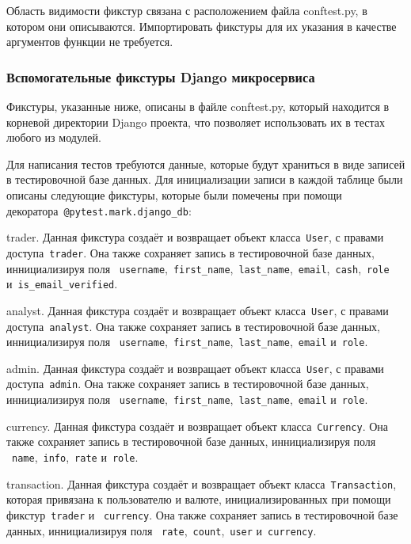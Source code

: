 Область видимости фикстур связана с расположением файла conftest.py, в котором они описываются.
Импортировать фикстуры для их указания в качестве аргументов функции не требуется.

\subsubsection{Вспомогательные фикстуры Django микросервиса}

Фикстуры, указанные ниже, описаны в файле conftest.py, который находится в корневой директории Django проекта,
что позволяет использовать их в тестах любого из модулей.

Для написания тестов требуются данные, которые будут храниться в виде записей в тестировочной базе данных.
Для инициализации записи в каждой таблице были описаны следующие фикстуры, которые были помечены при помощи декоратора~\lstinline{@pytest.mark.django_db}:
\begin{enumerate_num}
    \item trader.
    Данная фикстура создаёт и возвращает объект класса~\lstinline{User}, с правами доступа~\lstinline{trader}.
    Она также сохраняет запись в тестировочной базе данных, иннициализируя поля
    ~\lstinline{username},~\lstinline{first_name},~\lstinline{last_name},~\lstinline{email},~\lstinline{cash},~\lstinline{role} и~\lstinline{is_email_verified}.
    \item analyst.
    Данная фикстура создаёт и возвращает объект класса~\lstinline{User}, с правами доступа~\lstinline{analyst}.
    Она также сохраняет запись в тестировочной базе данных, иннициализируя поля
    ~\lstinline{username},~\lstinline{first_name},~\lstinline{last_name},~\lstinline{email} и~\lstinline{role}.
    \item admin.
    Данная фикстура создаёт и возвращает объект класса~\lstinline{User}, с правами доступа~\lstinline{admin}.
    Она также сохраняет запись в тестировочной базе данных, иннициализируя поля
    ~\lstinline{username},~\lstinline{first_name},~\lstinline{last_name},~\lstinline{email} и~\lstinline{role}.
    \item currency.
    Данная фикстура создаёт и возвращает объект класса~\lstinline{Currency}.
    Она также сохраняет запись в тестировочной базе данных, иннициализируя поля
    ~\lstinline{name},~\lstinline{info},~\lstinline{rate} и~\lstinline{role}.
    \item transaction.
    Данная фикстура создаёт и возвращает объект класса~\lstinline{Transaction}, которая привязана к пользователю и валюте,
    инициализированных при помощи фикстур~\lstinline{trader} и ~\lstinline{currency}.
    Она также сохраняет запись в тестировочной базе данных, иннициализируя поля
    ~\lstinline{rate},~\lstinline{count},~\lstinline{user} и~\lstinline{currency}.
\end{enumerate_num}

